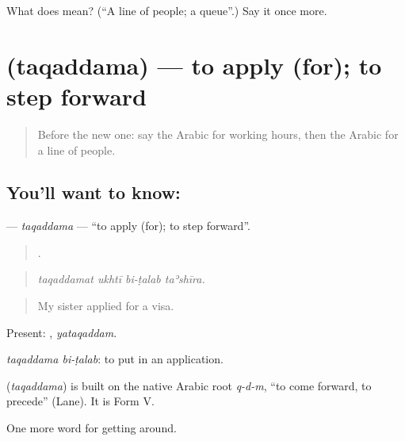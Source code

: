 \begin{tcolorbox}[breakable,colback=teal!4,colframe=teal!35!black,title={Before you move on}]
What does  mean? (\textquotedblleft{}A line of people; a queue\textquotedblright{}.) Say it once more.
\end{tcolorbox}
\section[\texorpdfstring{\ar{تقدم} (taqaddama)}{تقدم (taqaddama)}]{ (taqaddama) — to apply (for); to step forward}

\label{lesson:AR-C450-taqaddama}



\begin{quote}
Before the new one: say the Arabic for working hours, then the Arabic for a line of people.
\end{quote}

\subsection*{You'll want to know: }
\textbf{} — \emph{taqaddama} — \textquotedblleft{}to apply (for); to step forward\textquotedblright{}.

\begin{quote}
   .
\end{quote}

\begin{quote}
\emph{taqaddamat ukhtī bi-ṭalab taʾshīra.}
\end{quote}

\begin{quote}
My sister applied for a visa.
\end{quote}

Present: , \emph{yataqaddam}.

\emph{taqaddama bi-ṭalab}: to put in an application.

\begin{cousinweb}
\textbf{} (\emph{taqaddama}) is built on the native Arabic root \emph{q-d-m}, \textquotedblleft{}to come forward, to precede\textquotedblright{} (Lane). It is Form V.
\end{cousinweb}

\begin{grammarlens}[title={What you've built}]
One more word for getting around.
\end{grammarlens}

